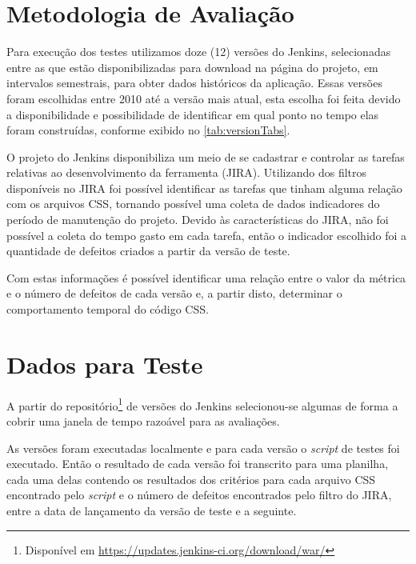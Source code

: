 \section{Metodologia de Avaliação}

Para execução dos testes utilizamos doze (12) versões do Jenkins, selecionadas entre as que estão disponibilizadas para download na página do projeto, em intervalos semestrais, para obter dados históricos da aplicação. Essas versões foram escolhidas entre 2010 até a versão mais atual, esta escolha foi feita devido a disponibilidade e possibilidade de identificar em qual ponto no tempo elas foram construídas, conforme exibido no \autoref{tab:versionTabs}.



O projeto do Jenkins disponibiliza um meio de se cadastrar e controlar as tarefas relativas ao desenvolvimento da ferramenta (JIRA\footnotemark). Utilizando dos filtros disponíveis no JIRA foi possível identificar as tarefas que tinham alguma relação com os arquivos CSS, tornando possível uma coleta de dados indicadores do período de manutenção do projeto. Devido às características do JIRA, não foi possível a coleta do tempo gasto em cada tarefa, então o indicador escolhido foi a quantidade de defeitos criados a partir da versão de teste.

Com estas informações é possível identificar uma relação entre o valor da métrica e o número de defeitos de cada versão e, a partir disto, determinar o comportamento temporal do código CSS.


\section{Dados para Teste}

A partir do repositório\footnote{Disponível em \url{https://updates.jenkins-ci.org/download/war/}} de versões do Jenkins selecionou-se algumas de forma a cobrir uma janela de tempo razoável para as avaliações.

As versões foram executadas localmente e para cada versão o \textit{script} de testes foi executado. Então o resultado de cada versão foi transcrito para uma planilha, cada uma delas contendo os resultados dos critérios para cada arquivo CSS encontrado pelo \textit{script} e o número de defeitos encontrados pelo filtro do JIRA, entre a data de lançamento da versão de teste e a seguinte.

